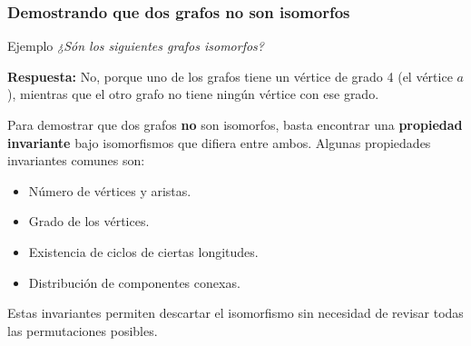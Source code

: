 \subsubsection{Demostrando que dos grafos no son isomorfos}



\begin{exampleblock}{Ejemplo}
\textit{¿Són los siguientes grafos isomorfos?}
\begin{center}
\end{center}

\medskip

\textbf{Respuesta:} No, porque uno de los grafos  tiene un v\'ertice de grado 4 (el v\'ertice $a$), mientras que el otro grafo no tiene ning\'un v\'ertice con ese grado.
\end{exampleblock}



\medskip

Para demostrar que dos grafos \textbf{no} son isomorfos, basta encontrar una \textbf{propiedad invariante} bajo isomorfismos que difiera entre ambos. Algunas propiedades invariantes comunes son:

\begin{itemize}
  \item N\'umero de v\'ertices y aristas.
  \item Grado de los v\'ertices.
  \item Existencia de ciclos de ciertas longitudes.
  \item Distribuci\'on de componentes conexas.
\end{itemize}

Estas invariantes permiten descartar el isomorfismo sin necesidad de revisar todas las permutaciones posibles.


